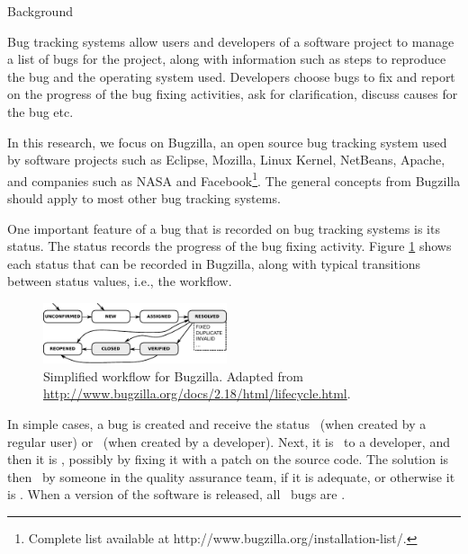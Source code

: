 \begin{section}{Background} \label{sec:background}


Bug tracking systems allow users and developers of a software project to manage a list of bugs for the project, along with information such as steps to reproduce the bug and the operating system used. Developers choose bugs to fix and report on the progress of the bug fixing activities, ask for clarification, discuss causes for the bug etc.

In this research, we focus on Bugzilla, an open source bug tracking system used by software projects such as Eclipse, Mozilla, Linux Kernel, NetBeans, Apache, and companies such as NASA and Facebook\footnote{Complete list available at http://www.bugzilla.org/installation-list/.}. The general concepts from Bugzilla should apply to most other bug tracking systems.

One important feature of a bug that is recorded on bug tracking systems is its status. The status records the progress of the bug fixing activity.
Figure \ref{fig:bugzilla} shows each status that can be recorded in Bugzilla, along with typical transitions between status values, i.e., the workflow.

\begin{figure}[ht]
	\centering
		\includegraphics[width=0.48\textwidth]{bugzilla}
	\caption{Simplified workflow for Bugzilla. Adapted from \url{http://www.bugzilla.org/docs/2.18/html/lifecycle.html}.}
	\label{fig:bugzilla}
\end{figure}

In simple cases, a bug is created and receive the status \UNCONFIRMED\ (when created by a regular user) or \NEW\ (when created by a developer). Next, it is \ASSIGNED\ to a developer, and then it is \RESOLVED, possibly by fixing it with a patch on the source code. The solution is then \VERIFIED\ by someone in the quality assurance team, if it is adequate, or otherwise it is \REOPENED. When a version of the software is released, all \VERIFIED\ bugs are \CLOSED.


\end{section}
